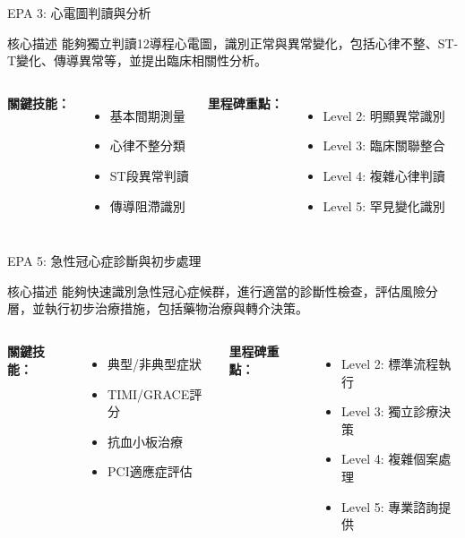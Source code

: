 \documentclass[aspectratio=169]{beamer}
\begin{document}
\begin{frame}{EPA 3: 心電圖判讀與分析}
\begin{alertblock}{核心描述}
能夠獨立判讀12導程心電圖，識別正常與異常變化，包括心律不整、ST-T變化、傳導異常等，並提出臨床相關性分析。
\end{alertblock}

\begin{columns}[c]
\textbf{關鍵技能：}
\begin{itemize}
\item 基本間期測量
\item 心律不整分類
\item ST段異常判讀
\item 傳導阻滯識別
\end{itemize}

\textbf{里程碑重點：}
\begin{itemize}
\item Level 2: 明顯異常識別
\item Level 3: 臨床關聯整合
\item Level 4: 複雜心律判讀
\item Level 5: 罕見變化識別
\end{itemize}
\end{columns}
\end{frame}

\begin{frame}{EPA 5: 急性冠心症診斷與初步處理}
\begin{alertblock}{核心描述}
能夠快速識別急性冠心症候群，進行適當的診斷性檢查，評估風險分層，並執行初步治療措施，包括藥物治療與轉介決策。
\end{alertblock}

\begin{columns}[c]
\textbf{關鍵技能：}
\begin{itemize}
\item 典型/非典型症狀
\item TIMI/GRACE評分
\item 抗血小板治療
\item PCI適應症評估
\end{itemize}

\textbf{里程碑重點：}
\begin{itemize}
\item Level 2: 標準流程執行
\item Level 3: 獨立診療決策
\item Level 4: 複雜個案處理
\item Level 5: 專業諮詢提供
\end{itemize}
\end{columns}
\end{frame}
\end{document}
